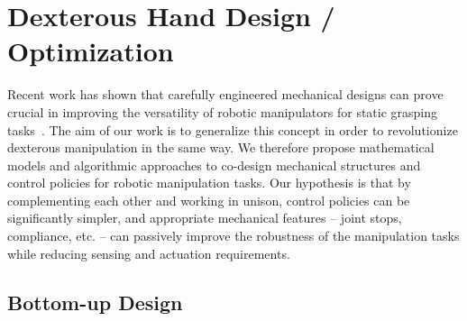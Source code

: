 \section{Dexterous Hand Design / Optimization}
  \label{secHandDesign}

\newcommand{\bA}{\mathbf{A}}
\newcommand{\bB}{\mathbf{B}}
\newcommand{\bC}{\mathbf{C}}
\newcommand{\bD}{\mathbf{D}}
\newcommand{\bE}{\mathbf{E}}
\newcommand{\bF}{\mathbf{F}}
\newcommand{\bG}{\mathbf{G}}
\newcommand{\bH}{\mathbf{H}}
\newcommand{\bI}{\mathbf{I}}
\newcommand{\bJ}{\mathbf{J}}
\newcommand{\bK}{\mathbf{K}}
\newcommand{\bM}{\mathbf{M}}
\newcommand{\bR}{\mathbf{R}}
\newcommand{\bU}{\mathbf{U}}
\newcommand{\ba}{\mathbf{a}}
\newcommand{\bb}{\mathbf{b}}
\newcommand{\bc}{\mathbf{c}}
\newcommand{\bd}{\mathbf{d}}
\newcommand{\be}{\mathbf{e}}
\newcommand{\bff}{\mathbf{f}}
\newcommand{\bg}{\mathbf{g}}
\newcommand{\bk}{\mathbf{k}}
\newcommand{\bm}{\mathbf{m}}
\newcommand{\bn}{\mathbf{n}}
\newcommand{\bp}{\mathbf{p}}
\newcommand{\bs}{\mathbf{s}}
\newcommand{\bt}{\mathbf{t}}
\newcommand{\bu}{\mathbf{u}}
\newcommand{\bv}{\mathbf{v}}
\newcommand{\bx}{\mathbf{x}}
\newcommand{\bl}{\mathbf{l}}
\newcommand{\bq}{\mathbf{q}}
\newcommand{\bw}{\vec{w}}
\newcommand{\bX}{\mathbf{X}}
\newcommand{\bS}{\mathbf{S}}
\newcommand{\bj}{\mathbf{j}}
\newcommand{\bT}{\mathbf{T}}
\newcommand{\bP}{\mathbf{P}}

\newcommand{\bbx}{\bar{\bx}}


Recent work has shown that carefully engineered mechanical designs can prove crucial in improving the versatility of robotic manipulators for static grasping tasks~\cite{Ciocarlie:2014:VGV:2674203.2674213}. The aim of our work is to generalize this concept in order to revolutionize dexterous manipulation in the same way. We therefore propose mathematical models and algorithmic approaches to co-design mechanical structures and control policies for robotic manipulation tasks. Our hypothesis is that by complementing each other and working in unison, control policies can be significantly simpler, and appropriate mechanical features -- joint stops, compliance, etc. -- can passively improve the robustness of the manipulation tasks while reducing sensing and actuation requirements. 

\subsection{Bottom-up Design}

